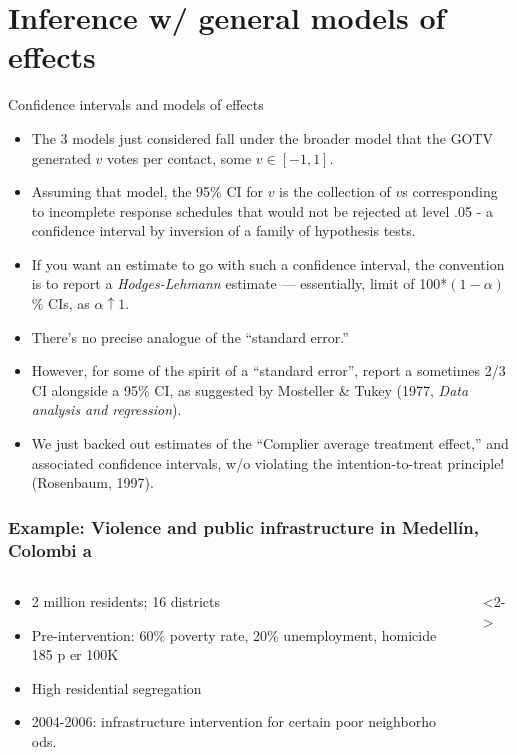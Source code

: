 


\section{Inference w/ general models of effects}

\begin{frame}{Confidence intervals and models of effects}

  \begin{itemize}[<+->]
  \item The 3 models just considered fall under the broader model that the GOTV
generated $v$ votes per contact, some $v \in [-1, 1]$.
\item Assuming that model, the 95\% CI for $v$ is the collection of $v$s corresponding to incomplete response schedules that would not be rejected at level .05 - a confidence interval by inversion of a family of hypothesis tests.
\item If you want an estimate to go with such a confidence interval, the convention is to report a \textit{Hodges-Lehmann} estimate --- essentially, limit of 100*$(1-\alpha)$\% CIs, as $\alpha \uparrow 1$.
\item There's no precise analogue of the ``standard error.''
\item However, for some of the spirit of a ``standard error'', report a sometimes 2/3 CI alongside a 95\% CI, as suggested by Mosteller \& Tukey (1977, \textit{Data analysis and regression}).
\item We just backed out estimates of the ``Complier average treatment effect,'' and associated confidence intervals, w/o violating the intention-to-treat principle! (Rosenbaum, 1997).
  \end{itemize}


\end{frame}


\begin{frame}
\frametitle{Example: Violence and public infrastructure in Medell{\'i}n, Colombi
a}
\begin{columns}
  \begin{column}{.5\linewidth}
    \begin{itemize}
    \item 2 million residents; 16 districts
    \item Pre-intervention: 60\% poverty rate, 20\% unemployment, homicide 185 p
er 100K
    \item High residential segregation
    \item<2-> 2004-2006: infrastructure intervention for certain poor neighborho
ods.
    \end{itemize}
  \end{column}
  \begin{column}{.5\linewidth}
\only<2-\mynoteonly>{}
  \end{column}
\end{columns}

\end{frame}



